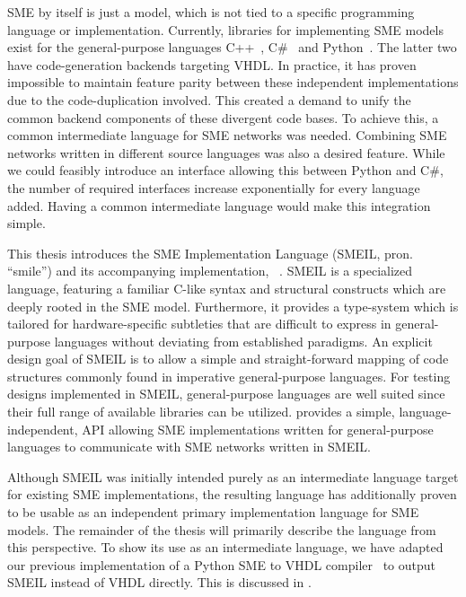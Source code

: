 SME by itself is just a model, which is not tied to a specific programming
language or implementation. Currently, libraries for implementing SME models
exist for the general-purpose languages C++~\cite{asheim2015},
C\#~\cite{skovhede2016building} and Python~\cite{asheim2016vhdl}. The latter two
have code-generation backends targeting VHDL. In practice, it has proven
impossible to maintain feature parity between these independent implementations
due to the code-duplication involved. This created a demand to unify the common
backend components of these divergent code bases. To achieve this, a common
intermediate language for SME networks was needed. Combining SME networks
written in different source languages was also a desired feature. While we could
feasibly introduce an interface allowing this between Python and C\#, the number
of required interfaces increase exponentially for every language added. Having a
common intermediate language would make this integration simple.

This thesis introduces the SME Implementation Language (SMEIL, pron. ``smile'')
and its accompanying implementation, \libsme{}~\cite{libsme}.
SMEIL is a specialized language, featuring a familiar C-like syntax and
structural constructs which are deeply rooted in the SME model. Furthermore, it
provides a type-system which is tailored for hardware-specific subtleties that
are difficult to express in general-purpose languages without deviating from
established paradigms. An explicit design goal of SMEIL is to allow a simple and
straight-forward mapping of code structures commonly found in imperative
general-purpose languages.  For testing designs implemented in SMEIL,
general-purpose languages are well suited since their full range of available
libraries can be utilized. \libsme{} provides a simple, language-independent,
API allowing SME implementations written for general-purpose languages to
communicate with SME networks written in SMEIL.

Although SMEIL was initially intended purely as an intermediate language target
for existing SME implementations, the resulting language has additionally proven
to be usable as an independent primary implementation language for SME
models. The remainder of the thesis will primarily describe the language from
this perspective. To show its use as an intermediate language, we have adapted
our previous implementation of a Python SME to VHDL compiler~\cite{almique} to
output SMEIL instead of VHDL directly. This is discussed in .



